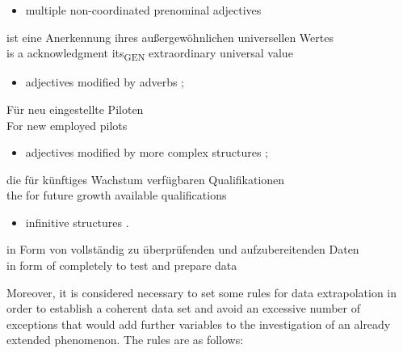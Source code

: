 \documentclass[output=paper,colorlinks,citecolor=brown]{langscibook}
\begin{document}
\begin{itemize}
\item multiple non-coordinated prenominal adjectives 
\end{itemize}


\ea%
    \label{ex:resi:7}
\gll ist  eine  Anerkennung  ihres          außergewöhnlichen  universellen  Wertes\\
     is  a  acknowledgment  its\textsubscript{GEN} extraordinary  universal  value\\
\z

\begin{itemize}
\item adjectives modified by adverbs ;
\end{itemize}

\ea%
    \label{ex:resi:8}
\gll Für  neu  eingestellte  Piloten \\
    For  new  employed  pilots \\
\z

\begin{itemize}
\item adjectives modified by more complex structures ;
\end{itemize}

\ea%
    \label{ex:resi:9}
\gll die  für  künftiges  Wachstum  verfügbaren  Qualifikationen \\
    the  for  future  growth  available  qualifications\\
\z

\newpage
\begin{itemize}
\item infinitive structures .
\end{itemize}

\ea%
    \label{ex:resi:10}
\gll in  Form  von  vollständig  zu  überprüfenden  und  aufzubereitenden  Daten \\
     in  form  of  completely  to test  and prepare  data\\
\z

Moreover, it is considered necessary to set some rules for data extrapolation in order to establish a coherent data set and avoid an excessive number of exceptions that would add further variables to the investigation of an already extended phenomenon. The rules are as follows:
\end{document}
